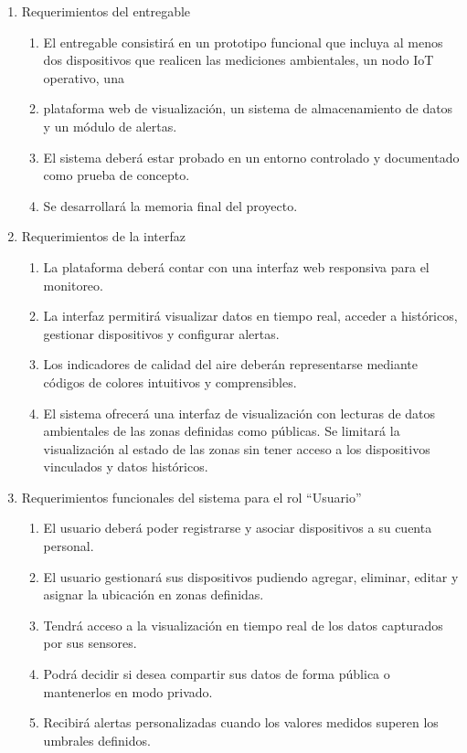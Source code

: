 \documentclass[
11pt, %
]{charter}
\begin{document}
\begin{enumerate}
	\item Requerimientos del entregable
	\begin{enumerate}
		\item El entregable consistirá en un prototipo funcional que incluya al menos dos dispositivos que realicen las mediciones ambientales, un nodo IoT operativo, una 		\item plataforma web de visualización, un sistema de almacenamiento de datos y un módulo de alertas.
		\item El sistema deberá estar probado en un entorno controlado y documentado como prueba de concepto.
		\item Se desarrollará la memoria final del proyecto.

	\end{enumerate}
	
	\item Requerimientos de la interfaz
	\begin{enumerate}
		\item La plataforma deberá contar con una interfaz web responsiva para el monitoreo.
		\item La interfaz permitirá visualizar datos en tiempo real, acceder a históricos, gestionar dispositivos y configurar alertas.
		\item Los indicadores de calidad del aire deberán representarse mediante códigos de colores intuitivos y comprensibles.
		\item El sistema ofrecerá una interfaz de visualización con lecturas de datos ambientales de las zonas definidas como públicas. Se limitará la visualización al estado de las zonas sin tener acceso a los dispositivos vinculados y datos históricos.

	\end{enumerate}

	\item Requerimientos funcionales del sistema para el rol “Usuario”
	\begin{enumerate}
		\item El usuario deberá poder registrarse y asociar dispositivos a su cuenta personal.
		\item El usuario gestionará sus dispositivos pudiendo agregar, eliminar, editar y asignar la ubicación en zonas definidas.
		\item Tendrá acceso a la visualización en tiempo real de los datos capturados por sus sensores.
		\item Podrá decidir si desea compartir sus datos de forma pública o mantenerlos en modo privado.
		\item Recibirá alertas personalizadas cuando los valores medidos superen los umbrales definidos.


\end{enumerate}
\end{enumerate}
\end{document}
